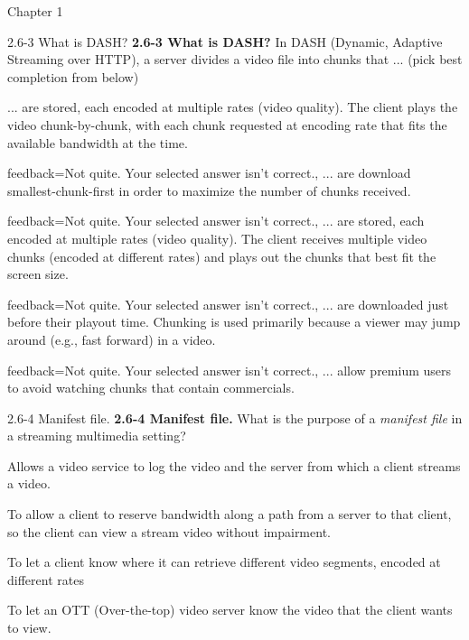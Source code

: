 \documentclass[a4paper]{article}
\begin{document}
\begin{quiz}{Chapter 1}
\begin{multi}[points=1,shuffle]{2.6-3 What is DASH?}
\textbf{2.6-3 What is DASH?} In DASH (Dynamic, Adaptive Streaming over HTTP), a server divides a video file into chunks that ... (pick best completion from below)
\item* ... are stored, each encoded at multiple rates (video quality).  The client plays the video chunk-by-chunk, with each chunk requested at encoding rate that fits the available bandwidth at the time.
\item[feedback={Not quite. Your selected answer isn't correct.},] ... are download smallest-chunk-first in order to maximize the number of chunks received.
\item[feedback={Not quite. Your selected answer isn't correct.},] ... are stored, each encoded at multiple rates (video quality).  The client receives multiple video chunks (encoded at different rates) and plays out the chunks that best fit the screen size.
\item[feedback={Not quite. Your selected answer isn't correct.},] ... are downloaded just before their playout time.  Chunking is used primarily because a viewer may jump around (e.g., fast forward) in a video.
\item[feedback={Not quite. Your selected answer isn't correct.},] ... allow premium users to avoid watching chunks that contain commercials.
\end{multi}

\begin{multi}[points=1,shuffle]{2.6-4 Manifest file.}
\textbf{2.6-4 Manifest file.} What is the purpose of a \emph{manifest file }in a streaming multimedia setting?
\item Allows a video service to log the video and the server from which a client streams a video.
\item To allow a client to reserve bandwidth along a path from a server to that client, so the client can view a stream video without impairment.
\item* To let a client know where it can retrieve different video segments, encoded at different rates
\item To let an OTT (Over-the-top) video server know the video that the client wants to view.
\end{multi}


\end{quiz}
\end{document}
